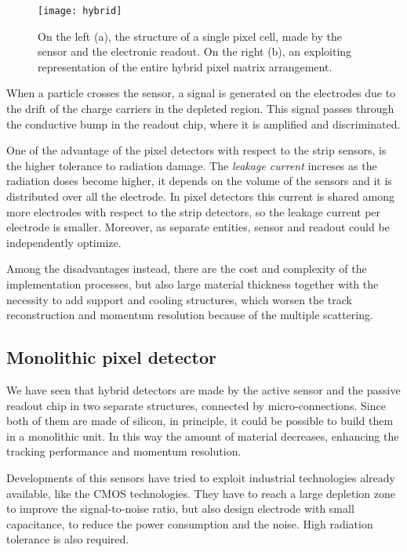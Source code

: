\begin{figure}[h!]
\centering
\texttt{[image: hybrid]}
\caption{On the left (a), the structure of a single pixel cell, made by the sensor and the electronic readout. On the right (b), an exploiting representation of the entire hybrid pixel matrix arrangement.}
\label{fig:hybrid}
\end{figure}

When a particle crosses the sensor, a signal is generated on the electrodes due to the drift of the charge carriers in the depleted region. This signal passes through the conductive bump in the readout chip, where it is amplified and discriminated.

One of the advantage of the pixel detectors with respect to the strip sensors, is the higher tolerance to radiation damage. The \emph{leakage current} increses as the radiation doses become higher, it depends on the volume of the sensors and it is distributed over all the electrode. In pixel detectors this current is shared among more electrodes with respect to the strip detectors, so the leakage current per electrode is smaller. Moreover, as separate entities, sensor and readout could be independently optimize.

Among the disadvantages instead, there are the cost and complexity of the implementation processes, but also large material thickness together with the necessity to add support and cooling structures, which worsen the track reconstruction and momentum resolution because of the multiple scattering.


\subsection{Monolithic pixel detector}

We have seen that hybrid detectors are made by the active sensor and the passive readout chip in two separate structures, connected by micro-connections. Since both of them are made of silicon, in principle, it could be possible to build them in a monolithic unit. In this way the amount of material decreases, enhancing the tracking performance and momentum resolution. 

Developments of this sensors have tried to exploit industrial technologies already available, like the CMOS technologies. They have to reach a large depletion zone to improve the signal-to-noise ratio, but also design electrode with small capacitance, to reduce the power consumption and the noise. High radiation tolerance is also required.

